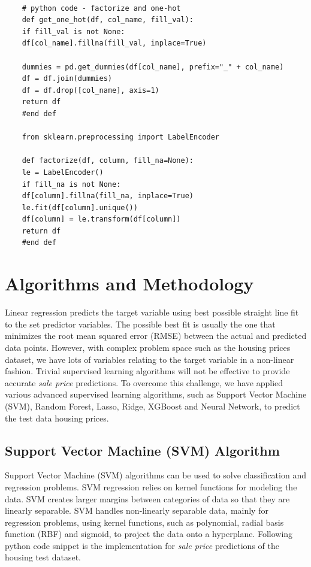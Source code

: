 \documentclass[sigconf]{acmart}
\begin{document}
	\begin{verbatim}
	
	# python code - factorize and one-hot
	def get_one_hot(df, col_name, fill_val):
	if fill_val is not None:
	df[col_name].fillna(fill_val, inplace=True)
	
	dummies = pd.get_dummies(df[col_name], prefix="_" + col_name)
	df = df.join(dummies)
	df = df.drop([col_name], axis=1)
	return df
	#end def
	
	from sklearn.preprocessing import LabelEncoder
	
	def factorize(df, column, fill_na=None):
	le = LabelEncoder()
	if fill_na is not None:
	df[column].fillna(fill_na, inplace=True)
	le.fit(df[column].unique())
	df[column] = le.transform(df[column])
	return df
	#end def
	\end{verbatim}
	
	\section{Algorithms and Methodology}
	
	Linear regression predicts the target variable using best possible straight line fit to the set predictor variables. The possible best fit is usually the one that minimizes the root mean squared error (RMSE) between the actual and predicted data points. However, with complex problem space such as the housing prices dataset, we have lots of variables relating to the target variable in a non-linear fashion. Trivial supervised learning algorithms will not be effective to provide accurate {\em sale price} predictions. To overcome this challenge, we have applied various advanced supervised learning algorithms, such as Support Vector Machine (SVM), Random Forest, Lasso, Ridge, XGBoost and Neural Network, to predict the test data housing prices.
	
	
	\subsection{Support Vector Machine (SVM) Algorithm}
	
	Support Vector Machine (SVM) algorithms can be used to solve classification and regression problems. SVM regression relies on kernel functions for modeling the data. SVM creates larger margins between categories of data so that they are linearly separable. SVM handles non-linearly separable data, mainly for regression problems, using kernel functions, such as polynomial, radial basis function (RBF) and sigmoid, to project the data onto a hyperplane. Following python code snippet is the implementation for {\em sale price} predictions of the housing test dataset.
	
\end{document}
